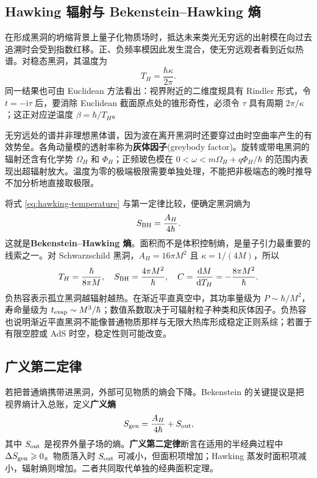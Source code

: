 \subsection{Hawking 辐射与 Bekenstein--Hawking 熵}

在形成黑洞的坍缩背景上量子化物质场时，抵达未来类光无穷远的出射模在向过去追溯时会受到指数红移。正、负频率模因此发生混合，使无穷远观者看到近似热谱。对稳态黑洞，其温度为
\begin{equation}\label{eq:hawking-temperature}
    T_H=\frac{\hbar\kappa}{2\pi}.
\end{equation}
同一结果也可由 Euclidean 方法看出：视界附近的二维度规具有 Rindler 形式，令 $t=-\mathrm{i}\tau$ 后，要消除 Euclidean 截面原点处的锥形奇性，必须令 $\tau$ 具有周期 $2\pi/\kappa$；这正对应逆温度 $\beta=\hbar/T_H$。

无穷远处的谱并非理想黑体谱，因为波在离开黑洞时还要穿过由时空曲率产生的有效势垒。各角动量模的透射率称为\textbf{灰体因子}(greybody factor)。旋转或带电黑洞的辐射还含有化学势 $\Omega_H$ 和 $\Phi_H$；正频玻色模在 $0<\omega<m\Omega_H+q\Phi_H/\hbar$ 的范围内表现出超辐射放大。温度为零的极端极限需要单独处理，不能把非极端态的晚时推导不加分析地直接取极限。

将式 \eqref{eq:hawking-temperature} 与第一定律比较，便确定黑洞熵为
\begin{equation}\label{eq:bek-hawking-entropy}
    S_{\rm BH}=\frac{A_H}{4\hbar}.
\end{equation}
这就是\textbf{Bekenstein--Hawking 熵}。面积而不是体积控制熵，是量子引力最重要的线索之一。对 Schwarzschild 黑洞，$A_H=16\pi M^2$ 且 $\kappa=1/(4M)$，所以
\begin{equation}
    T_H=\frac{\hbar}{8\pi M},\quad
    S_{\rm BH}=\frac{4\pi M^2}{\hbar},\quad
    C=\dv{M}{T_H}=-\frac{8\pi M^2}{\hbar}.
\end{equation}
负热容表示孤立黑洞越辐射越热。在渐近平直真空中，其功率量级为 $P\sim\hbar/M^2$，寿命量级为 $t_{\rm evap}\sim M^3/\hbar$；数值系数取决于可辐射粒子种类和灰体因子。负热容也说明渐近平直黑洞不能像普通物质那样与无限大热库形成稳定正则系综；若置于有限空腔或 AdS 时空，稳定性则可能改变。

\subsection{广义第二定律}

若把普通熵携带进黑洞，外部可见物质的熵会下降。Bekenstein 的关键提议是把视界熵计入总账，定义\textbf{广义熵}
\begin{equation}
    S_{\rm gen}=\frac{A_H}{4\hbar}+S_{\rm out},
\end{equation}
其中 $S_{\rm out}$ 是视界外量子场的熵。\textbf{广义第二定律}断言在适用的半经典过程中 $\Delta S_{\rm gen}\geqslant0$。物质落入时 $S_{\rm out}$ 可减小，但面积项增加；Hawking 蒸发时面积项减小，辐射熵则增加。二者共同取代单独的经典面积定理。

